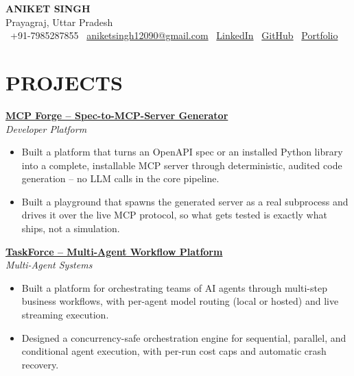 \documentclass[10pt,a4paper]{article}
\newcommand{\phone}[1]{\faPhone\ #1}
\newcommand{\email}[1]{\faEnvelope\ \href{mailto:#1}{#1}}
\newcommand{\linkedin}[1]{\faLinkedin\ \href{https://linkedin.com/in/#1}{LinkedIn}}
\newcommand{\github}[1]{\faGithub\ \href{https://github.com/#1}{GitHub}}
\newcommand{\portfolio}[1]{\faGlobe\ \href{https://#1}{Portfolio}}
\begin{document}
\begin{center}
    {\Huge \textbf{ANIKET SINGH}} \\
    \vspace{1pt}
    Prayagraj, Uttar Pradesh \\
    \vspace{4pt}
    \phone{+91-7985287855} \quad
    \email{aniketsingh12090@gmail.com} \quad
    \linkedin{aniketsingh} \quad
    \github{Aniketsingh12} \quad
    \portfolio{aniketsingh12.github.io/AI-enginer-protfolio}
\end{center}

\vspace{3pt}

\section{PROJECTS}

\href{https://aniketsingh12.github.io/AI-enginer-protfolio/#project-01}{\textbf{MCP Forge -- Spec-to-MCP-Server Generator}} \\
\textit{Developer Platform}
\begin{itemize}[leftmargin=*,noitemsep,topsep=1pt]
    \item Built a platform that turns an OpenAPI spec or an installed Python library into a complete, installable MCP server through deterministic, audited code generation -- no LLM calls in the core pipeline.
    \item Built a playground that spawns the generated server as a real subprocess and drives it over the live MCP protocol, so what gets tested is exactly what ships, not a simulation.
\end{itemize}

\vspace{4pt}

\href{https://aniketsingh12.github.io/AI-enginer-protfolio/#project-02}{\textbf{TaskForce -- Multi-Agent Workflow Platform}} \\
\textit{Multi-Agent Systems}
\begin{itemize}[leftmargin=*,noitemsep,topsep=1pt]
    \item Built a platform for orchestrating teams of AI agents through multi-step business workflows, with per-agent model routing (local or hosted) and live streaming execution.
    \item Designed a concurrency-safe orchestration engine for sequential, parallel, and conditional agent execution, with per-run cost caps and automatic crash recovery.
\end{itemize}
\end{document}
